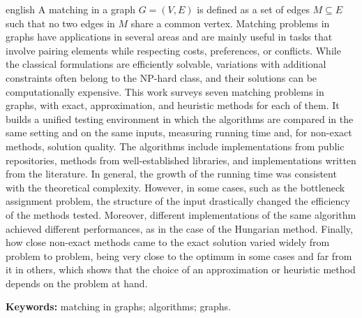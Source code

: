 \begin{resumo}[Abstract]
\begin{otherlanguage*}{english}
\noindent A matching in a graph $G=(V,E)$ is defined as a set of edges $M \subseteq E$ such that no two edges in $M$ share a common vertex. Matching problems in graphs have applications in several areas and are mainly useful in tasks that involve pairing elements while respecting costs, preferences, or conflicts. While the classical formulations are efficiently solvable, variations with additional constraints often belong to the NP-hard class, and their solutions can be computationally expensive. This work surveys seven matching problems in graphs, with exact, approximation, and heuristic methods for each of them. It builds a unified testing environment in which the algorithms are compared in the same setting and on the same inputs, measuring running time and, for non-exact methods, solution quality. The algorithms include implementations from public repositories, methods from well-established libraries, and implementations written from the literature. In general, the growth of the running time was consistent with the theoretical complexity. However, in some cases, such as the bottleneck assignment problem, the structure of the input drastically changed the efficiency of the methods tested. Moreover, different implementations of the same algorithm achieved different performances, as in the case of the Hungarian method. Finally, how close non-exact methods came to the exact solution varied widely from problem to problem, being very close to the optimum in some cases and far from it in others, which shows that the choice of an approximation or heuristic method depends on the problem at hand.\par

\noindent\textbf{Keywords:} matching in graphs; algorithms; graphs.
\end{otherlanguage*}
\end{resumo}
